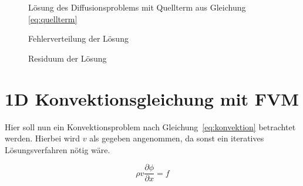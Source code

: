 \documentclass[11pt, ngerman,colorback,accentcolor=tud2d]{tudreport}
\begin{document}
\begin{figure}
\caption{Lösung des Diffusionsproblems mit Quellterm aus Gleichung \ref{eq:quellterm}}
\end{figure}

\begin{figure}
\caption{Fehlerverteilung der Lösung}
\end{figure}

\begin{figure}
\caption{Residuum der Lösung}
\end{figure}


\chapter{1D Konvektionsgleichung mit FVM}
\label{chap:1D Konvektionsgleichung mit FVM}

Hier soll nun ein Konvektionsproblem nach Gleichung~\ref{eq:konvektion} betrachtet
werden. Hierbei wird $v$ als gegeben angenommen, da sonst ein iteratives
Lösungsverfahren nötig wäre.

\begin{equation}
  \rho v \frac{\partial \phi}{\partial x} = f
  \label{eq:konvektion}
\end{equation}
\end{document}
